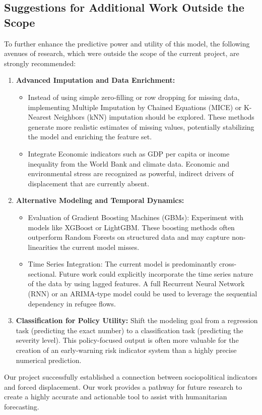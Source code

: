 \documentclass{article}
\theoremstyle{plain}
\theoremstyle{definition}
\theoremstyle{remark}
\begin{document}
\subsection{Suggestions for Additional Work Outside the Scope}

To further enhance the predictive power and utility of this model, the following avenues of research, which were outside the scope of the current project, are strongly recommended:

\begin{enumerate}
    \item \textbf{Advanced Imputation and Data Enrichment:}
    \begin{itemize}
        \item Instead of using simple zero-filling or row dropping for missing data, implementing Multiple Imputation by Chained Equations (MICE) or K-Nearest Neighbors (kNN) imputation should be explored. These methods generate more realistic estimates of missing values, potentially stabilizing the model and enriching the feature set.
        \item Integrate Economic indicators such as GDP per capita or income inequality from the World Bank and climate data. Economic and environmental stress are recognized as powerful, indirect drivers of displacement that are currently absent.
    \end{itemize}

    \item \textbf{Alternative Modeling and Temporal Dynamics:}
    \begin{itemize}
        \item Evaluation of Gradient Boosting Machines (GBMs): Experiment with models like XGBoost or LightGBM. These boosting methods often outperform Random Forests on structured data and may capture non-linearities the current model misses.
        \item Time Series Integration: The current model is predominantly cross-sectional. Future work could explicitly incorporate the time series nature of the data by using lagged features. A full Recurrent Neural Network (RNN) or an ARIMA-type model could be used to leverage the sequential dependency in refugee flows.
    \end{itemize}

    \item \textbf{Classification for Policy Utility:}
    Shift the modeling goal from a regression task (predicting the exact number) to a classification task (predicting the severity level). This policy-focused output is often more valuable for the creation of an early-warning risk indicator system than a highly precise numerical prediction.
\end{enumerate}
Our project successfully established a connection between sociopolitical indicators and forced displacement. Our work provides a pathway for future research to create a highly accurate and actionable tool to assist with humanitarian forecasting.
\end{document}
